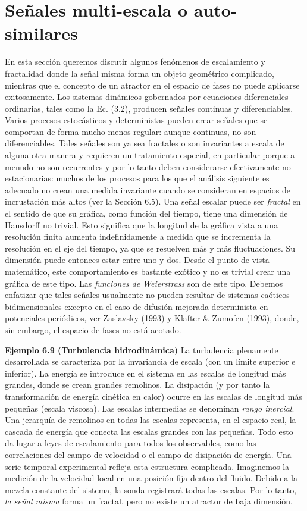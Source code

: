 \documentclass[10pt,a4paper]{book}
\begin{document}
\newpage

\section{Señales multi-escala o auto-similares}

En esta sección queremos discutir algunos fenómenos de escalamiento y fractalidad donde la señal misma forma un objeto geométrico complicado, mientras que el concepto de un atractor en el espacio de fases no puede aplicarse exitosamente. Los sistemas dinámicos gobernados por ecuaciones diferenciales ordinarias, tales como la Ec. (3.2), producen señales continuas y diferenciables. Varios procesos estocásticos y deterministas pueden crear señales que se comportan de forma mucho menos regular: aunque continuas, no son diferenciables. Tales señales son ya sea fractales o son invariantes a escala de alguna otra manera y requieren un tratamiento especial, en particular porque a menudo no son recurrentes y por lo tanto deben considerarse efectivamente no estacionarias: muchos de los procesos para los que el análisis siguiente es adecuado no crean una medida invariante cuando se consideran en espacios de incrustación más altos (ver la Sección 6.5). Una señal escalar puede ser \textit{fractal} en el sentido de que su gráfica, como función del tiempo, tiene una dimensión de Hausdorff no trivial. Esto significa que la longitud de la gráfica vista a una resolución finita aumenta indefinidamente a medida que se incrementa la resolución en el eje del tiempo, ya que se resuelven más y más fluctuaciones. Su dimensión puede entonces estar entre uno y dos. Desde el punto de vista matemático, este comportamiento es bastante exótico y no es trivial crear una gráfica de este tipo. Las \textit{funciones de Weierstrass} son de este tipo. Debemos enfatizar que tales señales usualmente no pueden resultar de sistemas caóticos bidimensionales excepto en el caso de difusión mejorada determinista en potenciales periódicos, ver Zaslavsky (1993) y Klafter \& Zumofen (1993), donde, sin embargo, el espacio de fases no está acotado.

\bigskip

\textbf{Ejemplo 6.9 (Turbulencia hidrodinámica)} La turbulencia plenamente desarrollada se caracteriza por la invariancia de escala (con un límite superior e inferior). La energía se introduce en el sistema en las escalas de longitud más grandes, donde se crean grandes remolinos. La disipación (y por tanto la transformación de energía cinética en calor) ocurre en las escalas de longitud más pequeñas (escala viscosa). Las escalas intermedias se denominan \textit{rango inercial}. Una jerarquía de remolinos en todas las escalas representa, en el espacio real, la cascada de energía que conecta las escalas grandes con las pequeñas. Todo esto da lugar a leyes de escalamiento para todos los observables, como las correlaciones del campo de velocidad o el campo de disipación de energía. Una serie temporal experimental refleja esta estructura complicada.  Imaginemos la medición de la velocidad local en una posición fija dentro del fluido. Debido a la mezcla constante del sistema, la sonda registrará todas las escalas. Por lo tanto, \textit{la señal misma} forma un fractal, pero no existe un atractor de baja dimensión.
\end{document}
